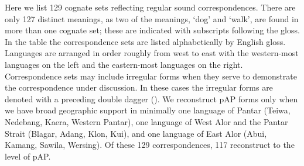 Here we list 129 cognate sets reflecting regular sound correspondences. There are only 127 distinct meanings, as two of the meanings, `dog' and `walk', are found in more than one cognate set; these are indicated with subscripts following the gloss. In the table the correspondence sets are listed alphabetically by English gloss. Languages are arranged in order roughly from west to east with the western-most languages on the left and the eastern-most languages on the right. Correspondence sets may include irregular forms when they serve to demonstrate the correspondence under discussion. In these cases the irregular forms are denoted with a preceding double dagger ({\ddag}). We reconstruct pAP forms only when we have broad geographic support in minimally one language of Pantar (Teiwa, Nedebang, Kaera, Western Pantar), one language of West Alor and the Pantar Strait (Blagar, Adang, 
Klon, Kui), and one language of East Alor (Abui, Kamang, Sawila, Wersing). Of these 129 correspondences, 117 reconstruct to the level of pAP.


